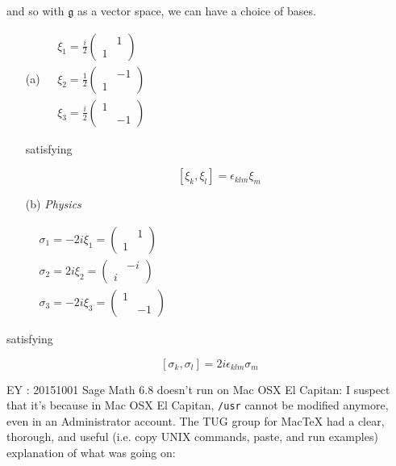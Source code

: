 \documentclass[10pt]{amsart}
\begin{document}
\begin{multicols*}{2}
and so with $\mathfrak{g}$ as a vector space, we can have a choice of bases.  

\begin{enumerate}
\item[(a)] $\begin{aligned}
  & \xi_1 = \frac{i}{2} \left( \begin{matrix} & 1 \\ 1 & \end{matrix} \right) \\ 
  & \xi_2 = \frac{1}{2} \left( \begin{matrix} & -1 \\ 1 & \end{matrix} \right) \\
  & \xi_3 = \frac{i}{2} \left( \begin{matrix} 1 &  \\  & -1 \end{matrix} \right) 
\end{aligned}$

satisfying 

\[
[\xi_k , \xi_l ] = \epsilon_{klm} \xi_m
\]
\item[(b)] \emph{Physics}

$\begin{aligned}
  & \sigma_1 = -2i \xi_1 =  \left( \begin{matrix} & 1 \\ 1 & \end{matrix} \right) \\ 
  & \sigma_2 = 2i \xi_2 =  \left( \begin{matrix} & -i \\ i & \end{matrix} \right) \\
  & \sigma_3 = -2i \xi_3 =  \left( \begin{matrix} 1 &  \\  & -1 \end{matrix} \right) 
\end{aligned}$
\end{enumerate}

satisfying 

\[
[ \sigma_k, \sigma_l ] = 2i \epsilon_{klm} \sigma_m
\]

EY : 20151001 Sage Math 6.8 doesn't run on Mac OSX El Capitan: I suspect that it's because in Mac OSX El Capitan, \verb|/usr| cannot be modified anymore, even in an Administrator account.  The TUG group for MacTeX had a clear, thorough, and useful (i.e. copy UNIX commands, paste, and run examples) explanation of what was going on:


\end{multicols*}
\end{document}
